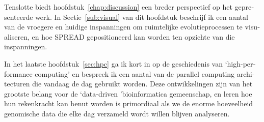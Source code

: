 \begin{otherlanguage}{dutch}
Tenslotte biedt hoofdstuk~\ref{chap:discussion} een breder perspectief op het gepresenteerde werk.
In Sectie~\ref{sub:visual} van dit hoofdstuk beschrijf ik een aantal van de vroegere en huidige inspanningen om ruimtelijke evolutieprocessen te visualiseren, en hoe SPREAD gepositioneerd kan worden ten opzichte van die inspanningen.

In het laatste hoofdstuk~\ref{sec:hpc} ga ik kort in op de geschiedenis van `high-performance computing' en bespreek ik een aantal van de parallel computing architecturen die vandaag de dag gebruikt worden.
Deze ontwikkelingen zijn van het grootste belang voor de `data-driven 'bioinformatica gemeenschap, en leren hoe hun rekenkracht kan benut worden is primordiaal als we de enorme hoeveelheid genomische data die elke dag verzameld wordt willen blijven analyseren.

\end{otherlanguage}
